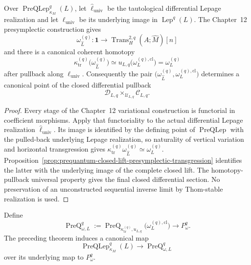 \begin{theorem}
\label{thm:prequantum-curvature-variational-transgression}
Over $\operatorname{PreQLep}_{\kappa_M}^{q}(L)$, let
$\widehat\ell_{\mathrm{univ}}$ be the tautological differential Lepage realization
and let $\ell_{\mathrm{univ}}$ be its underlying image in
$\operatorname{Lep}^{q}(L)$.  The Chapter~12 presymplectic construction gives
\[
\omega_{\widehat L}^{(q)}:
\mathbf1\longrightarrow
\operatorname{Trans}^{2,q}_H(A;\widehat M)[n]
\]
and there is a canonical coherent homotopy
\[
\boxed{
\kappa_{\mathrm{tr}}^{(q)}
\bigl(\omega_{\widehat L}^{(q)}\bigr)
\simeq
u_{L,q}
\bigl(\omega_L^{(q),\mathrm{cl}}\bigr)
=
\omega_L^{(q)}
}
\]
after pullback along $\ell_{\mathrm{univ}}$.  Consequently the pair
$\bigl(\omega_{\widehat L}^{(q)},\omega_L^{(q),\mathrm{cl}}\bigr)$ determines a
canonical point of the closed differential pullback
\[
\mathscr D_{L,q}\times_{\mathscr U_{L,q}}\mathscr C_{L,q}.
\]
\end{theorem}

\begin{proof}
Every stage of the Chapter~12 variational construction is functorial in
coefficient morphisms.  Apply that functoriality to the actual differential
Lepage realization $\widehat\ell_{\mathrm{univ}}$.  Its image is identified by
the defining point of $\operatorname{PreQLep}$ with the pulled-back underlying
Lepage realization, so naturality of vertical variation and horizontal
transgression gives
$\kappa_{\mathrm{tr}}^{(q)}\omega_{\widehat L}^{(q)}\simeq\omega_L^{(q)}$.
Proposition~\ref{prop:prequantum-closed-lift-presymplectic-transgression}
identifies the latter with the underlying image of the complete closed lift.  The
homotopy-pullback universal property gives the final closed differential section.
No preservation of an unconstructed sequential inverse limit by Thom-stable
realization is used.
\end{proof}

\begin{definition}
\label{def:prequantum-presymplectic-prequantization-family}
Define
\[
\boxed{
\operatorname{PreQ}_{\omega,L}^{q}
:=
\operatorname{PreQ}_{\kappa_{\mathrm{tr}}^{(q)},u_{L,q}}
\bigl(\omega_L^{(q),\mathrm{cl}}\bigr)
\longrightarrow
P_\omega^q.
}
\]
The preceding theorem induces a canonical map
\[
\boxed{
\operatorname{PreQLep}_{\kappa_M}^{q}(L)
\longrightarrow
\operatorname{PreQ}_{\omega,L}^{q}
}
\]
over its underlying map to $P_\omega^q$.
\end{definition}

